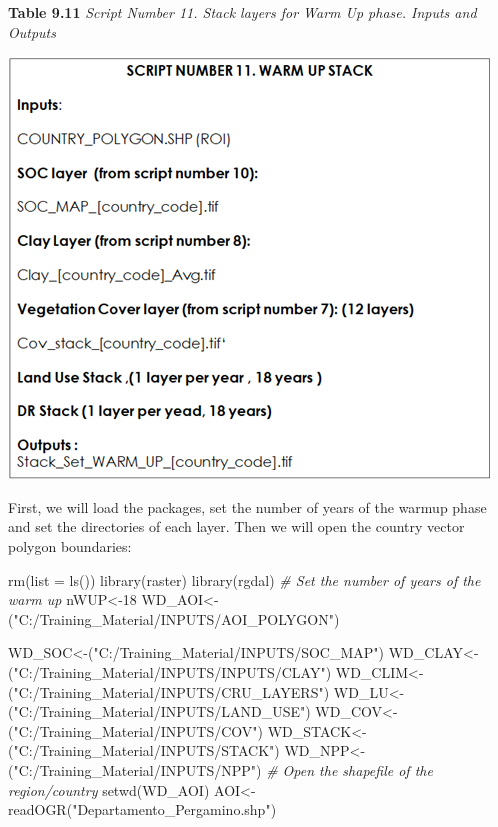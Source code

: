 \documentclass[
  10pt,
  b5paper,
]{book}
\newenvironment{Shaded}{\begin{snugshade}}{\end{snugshade}}
\newcommand{\AttributeTok}[1]{\textcolor[rgb]{0.77,0.63,0.00}{#1}}
\newcommand{\CommentTok}[1]{\textcolor[rgb]{0.56,0.35,0.01}{\textit{#1}}}
\newcommand{\DecValTok}[1]{\textcolor[rgb]{0.00,0.00,0.81}{#1}}
\newcommand{\FunctionTok}[1]{\textcolor[rgb]{0.00,0.00,0.00}{#1}}
\newcommand{\NormalTok}[1]{#1}
\newcommand{\OtherTok}[1]{\textcolor[rgb]{0.56,0.35,0.01}{#1}}
\newcommand{\StringTok}[1]{\textcolor[rgb]{0.31,0.60,0.02}{#1}}
\begin{document}
\textbf{Table 9.11} \emph{Script Number 11. Stack layers for Warm Up phase. Inputs and Outputs}

\includegraphics{tables/Table_9.10.png}

First, we will load the packages, set the number of years of the warmup phase and set the directories of each layer. Then we will open the country vector polygon boundaries:

\begin{Shaded}
\begin{Highlighting}[]
\FunctionTok{rm}\NormalTok{(}\AttributeTok{list =} \FunctionTok{ls}\NormalTok{())}
\FunctionTok{library}\NormalTok{(raster)}
\FunctionTok{library}\NormalTok{(rgdal)}
\CommentTok{\# Set the number of years of the warm up}
\NormalTok{nWUP}\OtherTok{\textless{}{-}}\DecValTok{18}
\NormalTok{WD\_AOI}\OtherTok{\textless{}{-}}\NormalTok{(}\StringTok{"C:/Training\_Material/INPUTS/AOI\_POLYGON"}\NormalTok{)}

\NormalTok{WD\_SOC}\OtherTok{\textless{}{-}}\NormalTok{(}\StringTok{"C:/Training\_Material/INPUTS/SOC\_MAP"}\NormalTok{)}
\NormalTok{WD\_CLAY}\OtherTok{\textless{}{-}}\NormalTok{(}\StringTok{"C:/Training\_Material/INPUTS/INPUTS/CLAY"}\NormalTok{)}
\NormalTok{WD\_CLIM}\OtherTok{\textless{}{-}}\NormalTok{(}\StringTok{"C:/Training\_Material/INPUTS/CRU\_LAYERS"}\NormalTok{)}
\NormalTok{WD\_LU}\OtherTok{\textless{}{-}}\NormalTok{(}\StringTok{"C:/Training\_Material/INPUTS/LAND\_USE"}\NormalTok{)}
\NormalTok{WD\_COV}\OtherTok{\textless{}{-}}\NormalTok{(}\StringTok{"C:/Training\_Material/INPUTS/COV"}\NormalTok{)}
\NormalTok{WD\_STACK}\OtherTok{\textless{}{-}}\NormalTok{(}\StringTok{"C:/Training\_Material/INPUTS/STACK"}\NormalTok{)}
\NormalTok{WD\_NPP}\OtherTok{\textless{}{-}}\NormalTok{(}\StringTok{"C:/Training\_Material/INPUTS/NPP"}\NormalTok{)}
\CommentTok{\# Open the shapefile of the region/country}
\FunctionTok{setwd}\NormalTok{(WD\_AOI)}
\NormalTok{AOI}\OtherTok{\textless{}{-}}\FunctionTok{readOGR}\NormalTok{(}\StringTok{"Departamento\_Pergamino.shp"}\NormalTok{)}
\end{Highlighting}
\end{Shaded}
\end{document}
